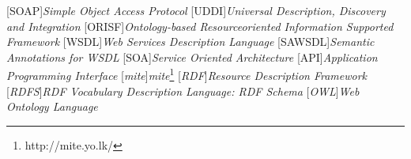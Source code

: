 
[SOAP]{\emph{Simple Object Access Protocol}}
[UDDI]{\emph{Universal Description, Discovery and Integration}}
[ORISF]{\emph{Ontology-based Resourceoriented Information Supported Framework}}
[WSDL]{\emph{Web Services Description Language}}
[SAWSDL]{\emph{Semantic Annotations for WSDL}}
[SOA]{\emph{Service Oriented Architecture}}
[API]{\emph{Application Programming Interface}}
[\emph{mite}]{\emph{mite}\footnote{http://mite.yo.lk/}}
[\emph{RDF}]{\emph{Resource Description Framework}}
[\emph{RDFS}]{\emph{RDF Vocabulary Description Language: RDF Schema}}
[\emph{OWL}]{\emph{Web Ontology Language}}
